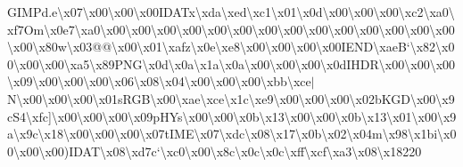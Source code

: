 G\+I\+M\+Pd.\+e\textbackslash{}x07\textbackslash{}x00\textbackslash{}x00\textbackslash{}x00\textquotesingle{}\+I\+D\+A\+Tx\textbackslash{}xda\textbackslash{}xed\textbackslash{}xc1\textbackslash{}x01\textbackslash{}x0d\textbackslash{}x00\textbackslash{}x00\textbackslash{}x00\textbackslash{}xc2\textbackslash{}xa0\textbackslash{}xf7\+Om\textbackslash{}x0e7\textbackslash{}xa0\textbackslash{}x00\textbackslash{}x00\textbackslash{}x00\textbackslash{}x00\textbackslash{}x00\textbackslash{}x00\textbackslash{}x00\textbackslash{}x00\textbackslash{}x00\textbackslash{}x00\textbackslash{}x00\textbackslash{}x00\textbackslash{}x00\textbackslash{}x00\textbackslash{}x00\textbackslash{}x80w\textbackslash{}x03@@\textbackslash{}x00\textbackslash{}x01\textbackslash{}xafz\textbackslash{}x0e\textbackslash{}xe8\textbackslash{}x00\textbackslash{}x00\textbackslash{}x00\textbackslash{}x00\+I\+E\+N\+D\textbackslash{}xae\+B`\textbackslash{}x82\textbackslash{}x00\textbackslash{}x00\textbackslash{}x00\textbackslash{}xa5\textbackslash{}x89\+P\+N\+G\textbackslash{}x0d\textbackslash{}x0a\textbackslash{}x1a\textbackslash{}x0a\textbackslash{}x00\textbackslash{}x00\textbackslash{}x00\textbackslash{}x0d\+I\+H\+D\+R\textbackslash{}x00\textbackslash{}x00\textbackslash{}x00\textbackslash{}x09\textbackslash{}x00\textbackslash{}x00\textbackslash{}x00\textbackslash{}x06\textbackslash{}x08\textbackslash{}x04\textbackslash{}x00\textbackslash{}x00\textbackslash{}x00\textbackslash{}xbb\textbackslash{}xce$\vert$\+N\textbackslash{}x00\textbackslash{}x00\textbackslash{}x00\textbackslash{}x01s\+R\+G\+B\textbackslash{}x00\textbackslash{}xae\textbackslash{}xce\textbackslash{}x1c\textbackslash{}xe9\textbackslash{}x00\textbackslash{}x00\textbackslash{}x00\textbackslash{}x02b\+K\+G\+D\textbackslash{}x00\textbackslash{}x9c\+S4\textbackslash{}xfc\mbox{]}\textbackslash{}x00\textbackslash{}x00\textbackslash{}x00\textbackslash{}x09p\+H\+Ys\textbackslash{}x00\textbackslash{}x00\textbackslash{}x0b\textbackslash{}x13\textbackslash{}x00\textbackslash{}x00\textbackslash{}x0b\textbackslash{}x13\textbackslash{}x01\textbackslash{}x00\textbackslash{}x9a\textbackslash{}x9c\textbackslash{}x18\textbackslash{}x00\textbackslash{}x00\textbackslash{}x00\textbackslash{}x07t\+I\+M\+E\textbackslash{}x07\textbackslash{}xdc\textbackslash{}x08\textbackslash{}x17\textbackslash{}x0b\textbackslash{}x02\textbackslash{}x04m\textbackslash{}x98\textbackslash{}x1bi\textbackslash{}x00\textbackslash{}x00\textbackslash{}x00)\+I\+D\+A\+T\textbackslash{}x08\textbackslash{}xd7c`\textbackslash{}xc0\textbackslash{}x00\textbackslash{}x8c\textbackslash{}x0c\textbackslash{}x0c\textbackslash{}xff\textbackslash{}xcf\textbackslash{}xa3\textbackslash{}x08\textbackslash{}x18220 